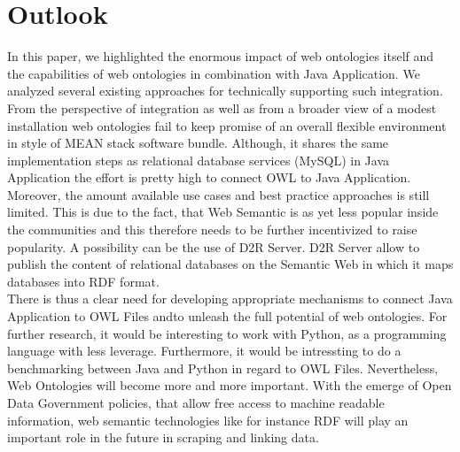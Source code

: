 \section{Outlook}

In this paper, we highlighted the enormous impact of web ontologies itself and the capabilities of web ontologies in combination with Java Application. We analyzed several existing approaches for technically supporting such integration. From the perspective of integration as well as from a broader view of a modest installation web ontologies fail to keep promise of an overall flexible environment in style of MEAN stack software bundle. Although, it shares the same implementation steps as relational database services (MySQL) in Java Application the effort is pretty high to connect OWL to Java Application. Moreover, the amount available use cases and best practice approaches is still limited. This is due to the fact, that Web Semantic is as yet less popular inside the communities and this therefore needs to be further incentivized to raise popularity. A possibility can be the use of D2R Server. D2R Server allow to publish the content of relational databases on the Semantic Web in which it maps databases into RDF format.\\ 

There is thus a clear need for developing appropriate mechanisms to connect Java Application to OWL Files andto unleash the full potential of web ontologies. For further research, it would be interesting to work with Python, as a programming language with less leverage. Furthermore, it would be intressting to do a benchmarking between Java and Python in regard to OWL Files. Nevertheless,  Web Ontologies will become more and more important. With the emerge of Open Data Government policies, that allow free access to machine readable information, web semantic technologies like for instance RDF will play an important role in the future in scraping and linking data.

\newpage